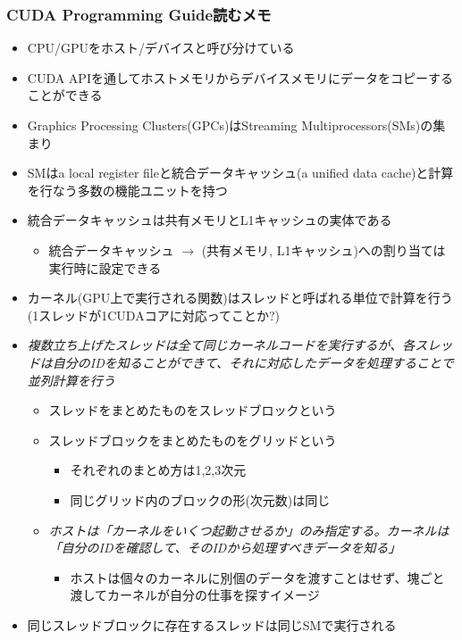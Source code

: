 \documentclass[12pt,a4paper,uplatex]{jsarticle}
\begin{document}
\subsubsection*{CUDA Programming Guide読むメモ}
\begin{itemize}
  \item CPU/GPUをホスト/デバイスと呼び分けている
  \item CUDA APIを通してホストメモリからデバイスメモリにデータをコピーすることができる
  \item Graphics Processing Clusters(GPCs)はStreaming Multiprocessors(SMs)の集まり
  \item SMはa local register fileと統合データキャッシュ(a unified data cache)と計算を行なう多数の機能ユニットを持つ
  \item 統合データキャッシュは共有メモリとL1キャッシュの実体である
  \begin{itemize}
    \item 統合データキャッシュ $\rightarrow$ (共有メモリ, L1キャッシュ)への割り当ては実行時に設定できる
  \end{itemize}
  \item カーネル(GPU上で実行される関数)はスレッドと呼ばれる単位で計算を行う(1スレッドが1CUDAコアに対応ってことか?)
  \item \emph{複数立ち上げたスレッドは全て同じカーネルコードを実行するが、各スレッドは自分のIDを知ることができて、それに対応したデータを処理することで並列計算を行う}
  \begin{itemize}
    \item スレッドをまとめたものをスレッドブロックという
    \item スレッドブロックをまとめたものをグリッドという
    \begin{itemize}
      \item それぞれのまとめ方は1,2,3次元
      \item 同じグリッド内のブロックの形(次元数)は同じ
    \end{itemize}
    \item \emph{ホストは「カーネルをいくつ起動させるか」のみ指定する。カーネルは「自分のIDを確認して、そのIDから処理すべきデータを知る」}
    \begin{itemize}
      \item ホストは個々のカーネルに別個のデータを渡すことはせず、塊ごと渡してカーネルが自分の仕事を探すイメージ
    \end{itemize}
  \end{itemize}
  \item 同じスレッドブロックに存在するスレッドは同じSMで実行される

\end{itemize}
\end{document}
